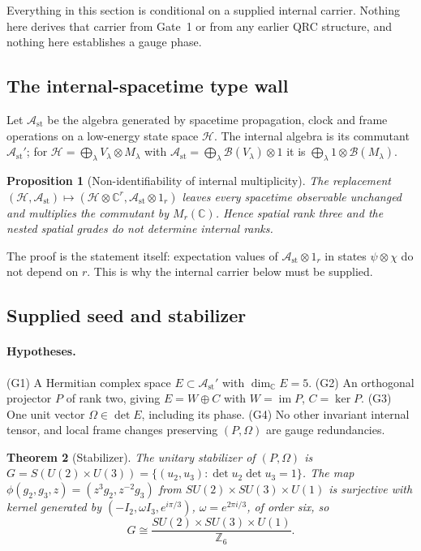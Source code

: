 \documentclass[11pt]{article}
\newtheorem{theorem}{Theorem}[section]
\newtheorem{proposition}[theorem]{Proposition}
\theoremstyle{definition}
\theoremstyle{remark}
\newcommand{\Z}{\mathbb{Z}}
\newcommand{\C}{\mathbb{C}}
\begin{document}
Everything in this section is conditional on a supplied internal carrier. Nothing here
derives that carrier from Gate~1 or from any earlier QRC structure, and nothing here
establishes a gauge phase.

\subsection{The internal-spacetime type wall}

Let $\mathcal A_{\mathrm{st}}$ be the algebra generated by spacetime propagation, clock
and frame operations on a low-energy state space $\mathcal H$. The internal algebra is
its commutant $\mathcal A_{\mathrm{st}}'$; for $\mathcal H=\bigoplus_\lambda V_\lambda
\otimes M_\lambda$ with $\mathcal A_{\mathrm{st}}=\bigoplus_\lambda\mathcal B(V_\lambda)
\otimes1$ it is $\bigoplus_\lambda1\otimes\mathcal B(M_\lambda)$.

\begin{proposition}[Non-identifiability of internal multiplicity]
\label{prop:amplification}
The replacement $(\mathcal H,\mathcal A_{\mathrm{st}})\mapsto(\mathcal H\otimes\C^r,
\mathcal A_{\mathrm{st}}\otimes1_r)$ leaves every spacetime observable unchanged and
multiplies the commutant by $M_r(\C)$. Hence spatial rank three and the nested spatial
grades do not determine internal ranks.
\end{proposition}

The proof is the statement itself: expectation values of $\mathcal A_{\mathrm{st}}\otimes
1_r$ in states $\psi\otimes\chi$ do not depend on $r$. This is why the internal carrier
below must be supplied.

\subsection{Supplied seed and stabilizer}

\paragraph{Hypotheses.} (G1) A Hermitian complex space $E\subset\mathcal A_{\mathrm{st}}'$
with $\dim_\C E=5$. (G2) An orthogonal projector $P$ of rank two, giving
$E=W\oplus C$ with $W=\operatorname{im}P$, $C=\ker P$. (G3) One unit vector
$\Omega\in\det E$, including its phase. (G4) No other invariant internal tensor, and local
frame changes preserving $(P,\Omega)$ are gauge redundancies.

\begin{theorem}[Stabilizer]
\label{thm:stabilizer}
The unitary stabilizer of $(P,\Omega)$ is $G=S(U(2)\times U(3))=\{(u_2,u_3):\det u_2
\det u_3=1\}$. The map $\phi(g_2,g_3,z)=(z^3g_2,z^{-2}g_3)$ from $SU(2)\times SU(3)\times
U(1)$ is surjective with kernel generated by $(-I_2,\omega I_3,e^{i\pi/3})$,
$\omega=e^{2\pi i/3}$, of order six, so
\begin{equation}
G\cong\frac{SU(2)\times SU(3)\times U(1)}{\Z_6}.
\end{equation}
\end{theorem}
\end{document}
